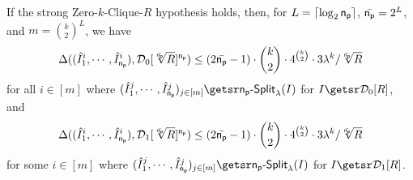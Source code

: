 \begin{theorem}
\label{thm:npsplit}
If the strong Zero-$k$-Clique-$R$ hypothesis holds, then, for $L=\lceil\log_2\mathsf{n_p}\rceil$, $\bar{\mathsf{n_p}}=2^L$, and $m=\binom{k}{2}^{L}$, we have
$$\Delta((\hat{I}_1^i, \cdots, \hat{I}_{\mathsf{n_p}}^i), \mathcal{D}_0[\sqrt[\bar{\mathsf{n_p}}]{R}]^{\mathsf{n_p}}) \leq (2\bar{\mathsf{n_p}}-1) \cdot \binom{k}{2} \cdot 4^{\binom{k}{2}} \cdot 3\lambda^k/\sqrt[\bar{\mathsf{n_p}}]{R}$$ for all $i \in [m]$ where $(\hat{\instance}_1^j, \cdots, \hat{\instance}_\pnum^j)_{j \in [m]} \getsr \npsplit(I)$ for $\instance \getsr \zkcdistzero{R}$, and
$$\Delta((\hat{I}_1^i, \cdots, \hat{I}_{\mathsf{n_p}}^i), \mathcal{D}_1[\sqrt[\bar{\mathsf{n_p}}]{R}]^{\mathsf{n_p}}) \leq (2\bar{\mathsf{n_p}}-1) \cdot \binom{k}{2} \cdot 4^{\binom{k}{2}} \cdot 3\lambda^k/\sqrt[\bar{\mathsf{n_p}}]{R}$$ for some $i \in [m]$ where $(\hat{\instance}_1^j, \cdots, \hat{\instance}_\pnum^j)_{j \in [m]} \getsr \npsplit(I)$ for $\instance \getsr \zkcdistone{R}$.


\end{theorem}

